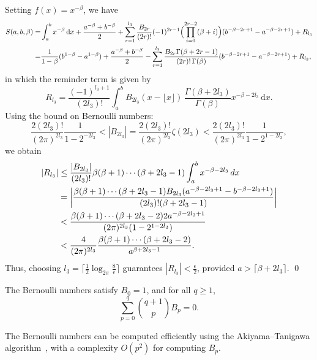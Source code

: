 \documentclass[aps,pra,twocolumn,superscriptaddress,preprintnumbers,amsmath,amssymb]{revtex4-2}
\begin{document}
Setting $f(x)=x^{-\beta}$, we have
\begin{align}
    S(a,b,\beta)
    =&\int_{a}^{b} x^{-\beta}\,\mathrm{d}x
  + \frac{a^{-\beta}+b^{-\beta}}{2}
  + \sum_{r=1}^{l_3} \frac{B_{2r}}{(2r)!}(-1)^{2r-1}\Bigl(\prod\limits_{i=0}^{2r-2}(\beta+i)\Bigr)( b^{-\beta-2r+1}-a^{-\beta-2r+1})+ R_{l_3}\notag\\
  =&\frac{1}{1-\beta}(b^{1-\beta}-a^{1-\beta})+ \frac{a^{-\beta}+b^{-\beta}}{2}-\sum_{r=1}^{l_3}\frac{B_{2r}\Gamma(\beta+2r-1)}{(2r)!\,\Gamma(\beta)}( b^{-\beta-2r+1}-a^{-\beta-2r+1})+ R_{l_3},
\end{align}
in which the reminder term is given by
\begin{equation}
    R_{l_3}=\frac{(-1)^{l_3+1}}{(2l_3)!}\int_{a}^{b} B_{2l_3}(x-\lfloor x\rfloor)\,
        \frac{\Gamma(\beta+2l_3)}{\Gamma(\beta)}x^{-\beta-2l_3}\,\mathrm{d}x.
\end{equation}
Using the bound on Bernoulli numbers:
\begin{equation}
    \frac{2(2l_3)!}{(2\pi)^{2l_3}}\frac{1}{1-2^{-2l_3}}< |B_{2l_3}|=\frac{2(2l_3)!}{(2\pi)^{2l_3}}\zeta(2l_3)<\frac{2(2l_3)!}{(2\pi)^{2l_3}}\frac{1}{1-2^{1-2l_3}},
\end{equation}
we obtain
\begin{align}
    |R_{l_3}|&\leq\frac{|B_{2l_3}|}{(2l_3)!}\beta(\beta+1)\cdots (\beta+2l_3-1)\int_{a}^{b}x^{-\beta-2l_3}\,dx \notag\\
    &=\left|\frac{\beta(\beta+1)\cdots(\beta+2l_3-1)B_{2l_3}(a^{-\beta-2l_3+1}-b^{-\beta-2l_3+1})}{(2l_3)!(\beta+2l_3-1)}\right|\notag\\
    &<\frac{\beta(\beta+1)\cdots(\beta+2l_3-2)2a^{-\beta-2l_3+1}}{(2\pi)^{2l_3}(1-2^{1-2l_3})}\notag\\
    &<\frac{4}{(2\pi)^{2l_3}}\frac{\beta(\beta+1)\cdots(\beta+2l_3-2)}{a^{\beta+2l_3-1}}.  
\end{align}
Thus, choosing $l_3=\lceil\frac{1}{2}\log_{2\pi}\frac{8}{\epsilon}\rceil$ guarantees $|R_{l_3}|<\frac{\epsilon}{2}$, provided $a>\lceil\beta+2l_3\rceil$.  \qed
\begin{corollary}
The Bernoulli numbers satisfy $B_{0}=1$, and for all $q\geq 1$,
\begin{equation}
\sum_{p=0}^{q}\binom{q+1}{p}B_{p}=0.
\end{equation}
\end{corollary}
\noindent The Bernoulli numbers can be computed efficiently using the Akiyama–Tanigawa algorithm~\cite{akiyama2001multiple}, with a complexity $O(p^{2})$ for computing $B_p$.
\end{document}

